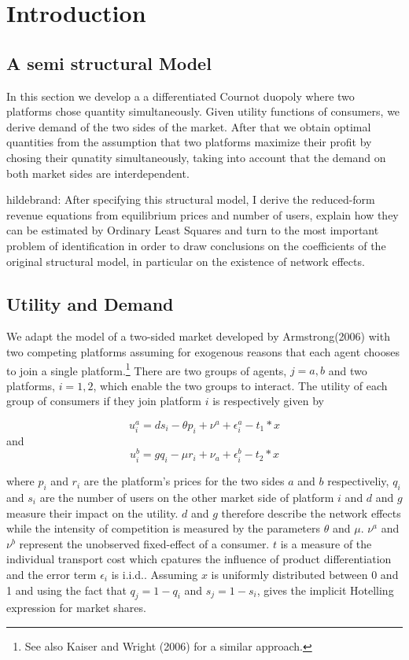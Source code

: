 \documentclass[10pt,a4paper]{article}
\begin{document}
\section{Introduction}


\subsection{A semi structural Model}
In this section we develop a a differentiated Cournot duopoly where two platforms chose quantity simultaneously.
Given utility functions of consumers, we derive demand of the two sides of the market. After that we obtain optimal quantities from the assumption that two platforms maximize their profit by chosing their qunatity simultaneously, taking into account that the demand on both market sides are interdependent. 

hildebrand: After specifying this structural model, I derive the reduced-form revenue equations from equilibrium prices and number of users, explain how they can be estimated by Ordinary Least Squares and turn to the most important problem of identification in order to draw conclusions on the coefficients of the original structural model, in particular on the existence of network effects.

\subsection{Utility and Demand}
We adapt the model of a two-sided market developed by Armstrong(2006) with two competing platforms assuming for exogenous reasons that each agent chooses to join a single platform.\footnote{See also Kaiser and Wright (2006) for a similar approach.} There are two groups of agents, $j= a, b$ and two platforms, $ i = 1,2$, which enable the two groups to interact. The utility of each group of consumers if they join platform $i$ is respectively given by 

\begin{equation}
u^a_i = ds_i-\theta p_i+\nu^a+\epsilon^a_i-t_1*x
\end{equation} and \begin{equation}
 u^b_i = gq_i-\mu r_i+\nu_a+\epsilon^b_i-t_2*x
\end{equation}

where $p_i$ and $r_i$ are the platform's prices for the two sides $a$ and $b$ respectiveliy, $q_i$ and $s_i$ are the number of users on the other market side of platform $i$ and $d$ and $g$ measure their impact on the utility. $d$ and $g$ therefore describe the network effects while the intensity of competition is measured by the parameters $\theta$ and $\mu$. $\nu^a$ and $\nu^b$ represent the unobserved fixed-effect of a consumer. $t$ is a measure of the individual transport cost which cpatures the influence of product differentiation and the error term $\epsilon_i$ is i.i.d.. Assuming $x$ is uniformly distributed between 0 and 1 and using the fact that $q_j=1-q_i$ and $s_j=1-s_i$, gives the implicit Hotelling expression for market shares. 
\end{document}
